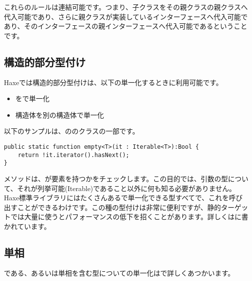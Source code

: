 これらのルールは連結可能です。つまり、子クラスをその親クラスの親クラスへ代入可能であり、さらに親クラスが実装しているインターフェースへ代入可能であり、そのインターフェースの親インターフェースへ代入可能であるということです。


\subsection{構造的部分型付け}
\label{type-system-structural-subtyping}


Haxeでは構造的部分型付けは、以下の単一化するときに利用可能です。

\begin{itemize}
	\item {}をで単一化
	\item 構造体を別の構造体で単一化
\end{itemize}

以下のサンプルは、ののクラスの一部です。

\begin{lstlisting}
public static function empty<T>(it : Iterable<T>):Bool {
	return !it.iterator().hasNext();
}
\end{lstlisting}

メソッドは、が要素を持つかをチェックします。この目的では、引数の型について、それが列挙可能(Iterable)であること以外に何も知る必要がありません。Haxe標準ライブラリにはたくさんあるで単一化できる型すべてで、これを呼び出すことができるわけです。この種の型付けは非常に便利ですが、静的ターゲットでは大量に使うとパフォーマンスの低下を招くことがあります。詳しくはに書かれています。


\subsection{単相}
\label{type-system-monomorphs}

である、あるいは単相を含む型についての単一化はで詳しくあつかいます。

